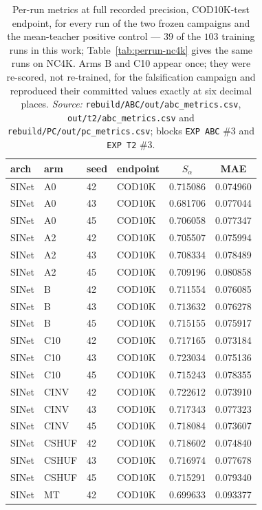 \begin{table}[p]
\caption{Per-run metrics at full recorded precision, COD10K-test endpoint, for every run of the two
frozen campaigns and the mean-teacher positive control --- $39$ of the $103$ training runs in this
work; Table~\ref{tab:perrun-nc4k} gives the same runs on NC4K. Arms B and C10 appear once; they were
re-scored, not re-trained, for the falsification campaign and reproduced their committed values
exactly at six decimal places. \emph{Source:} \texttt{rebuild/ABC/out/abc\_metrics.csv},
\texttt{out/t2/abc\_metrics.csv} and \texttt{rebuild/PC/out/pc\_metrics.csv}; blocks
\texttt{EXP ABC} \#3 and \texttt{EXP T2} \#3.}
\label{tab:perrun}
\begin{center}\small
\begin{tabular}{llllcc}
\toprule
arch & arm & seed & endpoint & $S_\alpha$ & MAE \\
\midrule
SINet & A0 & 42 & COD10K & 0.715086 & 0.074960 \\
SINet & A0 & 43 & COD10K & 0.681706 & 0.077044 \\
SINet & A0 & 45 & COD10K & 0.706058 & 0.077347 \\
SINet & A2 & 42 & COD10K & 0.705507 & 0.075994 \\
SINet & A2 & 43 & COD10K & 0.708334 & 0.078489 \\
SINet & A2 & 45 & COD10K & 0.709196 & 0.080858 \\
SINet & B & 42 & COD10K & 0.711554 & 0.076085 \\
SINet & B & 43 & COD10K & 0.713632 & 0.076278 \\
SINet & B & 45 & COD10K & 0.715155 & 0.075917 \\
SINet & C10 & 42 & COD10K & 0.717165 & 0.073184 \\
SINet & C10 & 43 & COD10K & 0.723034 & 0.075136 \\
SINet & C10 & 45 & COD10K & 0.715243 & 0.078355 \\
SINet & CINV & 42 & COD10K & 0.722612 & 0.073910 \\
SINet & CINV & 43 & COD10K & 0.717343 & 0.077323 \\
SINet & CINV & 45 & COD10K & 0.718084 & 0.073607 \\
SINet & CSHUF & 42 & COD10K & 0.718602 & 0.074840 \\
SINet & CSHUF & 43 & COD10K & 0.716974 & 0.077678 \\
SINet & CSHUF & 45 & COD10K & 0.715291 & 0.079340 \\
SINet & MT & 42 & COD10K & 0.699633 & 0.093377 \\

\end{tabular}
\end{center}
\end{table}
